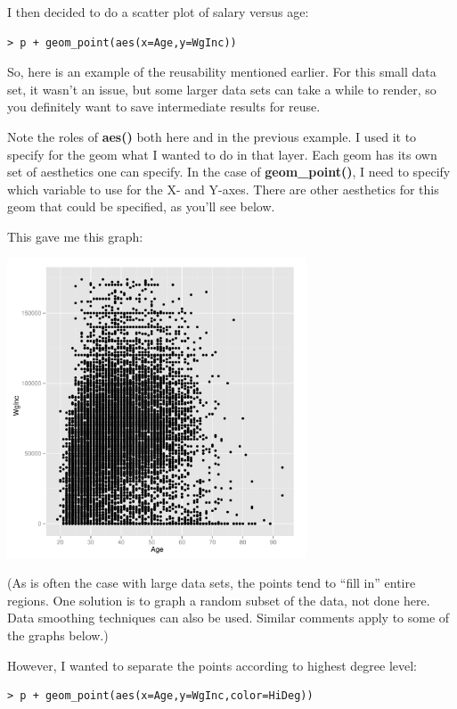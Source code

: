 I then decided to do a scatter plot of salary versus age:

\begin{lstlisting}
> p + geom_point(aes(x=Age,y=WgInc))
\end{lstlisting}

So, here is an example of the reusability mentioned earlier.  For this
small data set, it wasn't an issue, but some larger data sets can take a
while to render, so you definitely want to save intermediate results for
reuse.

Note the roles of {\bf aes()} both here and in the previous example.  I
used it to specify for the geom what I wanted to do in that layer.  Each
geom has its own set of aesthetics one can specify.  In the case of {\bf
geom\_point()}, I need to specify which variable to use for the X- and
Y-axes.  There are other aesthetics for this geom that could be
specified, as you'll see below.

This gave me this graph:

\includegraphics[bb=0 0 504 504,width=3.5in]{AgeInc.pdf}

(As is often the case with large data sets, the points tend to ``fill
in'' entire regions.  One solution is to graph a random subset of the
data, not done here.  Data smoothing techniques can also be used.
Similar comments apply to some of the graphs below.)

However, I wanted to separate the points according to highest degree
level:

\begin{lstlisting}
> p + geom_point(aes(x=Age,y=WgInc,color=HiDeg))
\end{lstlisting}

